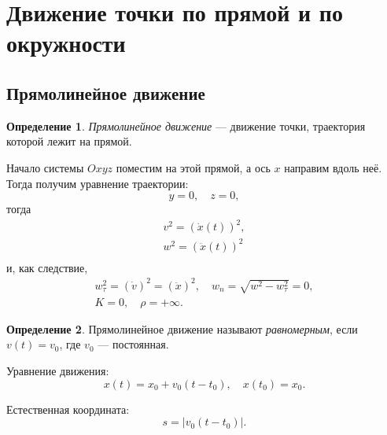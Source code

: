 \documentclass{article}
\theoremstyle{definition}
\newtheorem{definition}{Определение}[section]
\theoremstyle{plain}
\theoremstyle{remark}
\numberwithin{equation}{section}
\newcommand{\abs}[1]{\left|#1\right|}
\begin{document}
\pagebreak


\section{Движение точки по прямой и по окружности}

\subsection{Прямолинейное движение}

\begin{definition}
  \textit{Прямолинейное движение} --- движение точки, траектория которой лежит
  на прямой.
\end{definition}

Начало системы $Oxyz$ поместим на этой прямой, а ось $x$ направим вдоль неё.
Тогда получим уравнение траектории:
\begin{equation*}
  y = 0, \quad z = 0,
\end{equation*}
тогда
\begin{equation*}
  \begin{gathered}
    v^2 = (\dot{x}(t))^2, \\
    w^2 = (\ddot{x}(t))^2 \\
  \end{gathered}
\end{equation*}
и, как следствие,
\begin{equation*}
  \begin{gathered}
    w_\tau^2 = (\dot{v})^2 = (\ddot{x})^2, \quad
      w_n = \sqrt{w^2 - w_\tau^2} = 0, \\
    K = 0, \quad \rho = +\infty.
  \end{gathered}
\end{equation*}

\begin{definition}
  Прямолинейное движение называют \textit{равномерным}, если $v(t) = v_0$,
  где $v_0$ --- постоянная.

  Уравнение движения:
  \begin{equation*}
    x(t) = x_0 + v_0 (t - t_0), \quad x(t_0) = x_0.
  \end{equation*}

  Естественная координата:
  \begin{equation*}
    s = \abs{v_0 (t - t_0)}.
  \end{equation*}
\end{definition}
\end{document}
